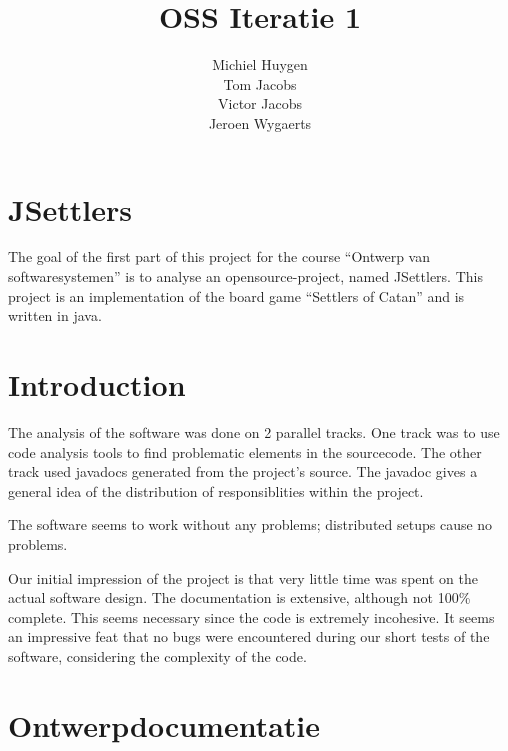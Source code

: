 \documentclass[pdftex12pt, a4paper]{article}
\begin{document}
\begin{titlepage}

\title{OSS Iteratie 1}
\author{Michiel Huygen\\Tom Jacobs\\Victor Jacobs\\Jeroen Wygaerts}

\maketitle
\thispagestyle{empty}

\end{titlepage}

\newpage

\tableofcontents

\newpage


\section*{JSettlers}

The goal of the first part of this project for the course ``Ontwerp van softwaresystemen'' is to analyse an opensource-project, named JSettlers. 
This project is an implementation of the board game ``Settlers of Catan'' and is written in java.

\section{Introduction}
The analysis of the software was done on 2 parallel tracks. 
One track was to use code analysis tools to find problematic elements in the sourcecode. 
The other track used javadocs generated from the project's source. 
The javadoc gives a general idea of the distribution of responsiblities within the project.

The software seems to work without any problems; distributed setups cause no problems.

Our initial impression of the project is that very little time was spent on the actual software design. 
The documentation is extensive, although not 100\% complete. 
This seems necessary since the code is extremely incohesive. 
It seems an impressive feat that no bugs were encountered during our short tests of the software, considering the complexity of the code. 

\newpage
\section{Ontwerpdocumentatie}
\end{document}
